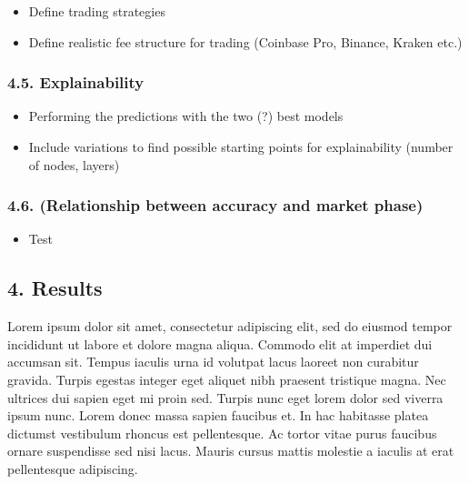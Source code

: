 \documentclass[
]{article}
\providecommand{\tightlist}{%
  \setlength{\itemsep}{0pt}\setlength{\parskip}{0pt}}
\begin{document}
\begin{itemize}
\item
  Define trading strategies
\item
  Define realistic fee structure for trading (Coinbase Pro, Binance,
  Kraken etc.)
\end{itemize}

\hypertarget{explainability}{%
\subsubsection{4.5. Explainability}\label{explainability}}

\begin{itemize}
\item
  Performing the predictions with the two (?) best models
\item
  Include variations to find possible starting points for explainability
  (number of nodes, layers)
\end{itemize}

\hypertarget{relationship-between-accuracy-and-market-phase}{%
\subsubsection{4.6. (Relationship between accuracy and market
phase)}\label{relationship-between-accuracy-and-market-phase}}

\begin{itemize}
\tightlist
\item
  Test
\end{itemize}

\newpage

\hypertarget{results}{%
\subsection{4. Results}\label{results}}

Lorem ipsum dolor sit amet, consectetur adipiscing elit, sed do eiusmod
tempor incididunt ut labore et dolore magna aliqua. Commodo elit at
imperdiet dui accumsan sit. Tempus iaculis urna id volutpat lacus
laoreet non curabitur gravida. Turpis egestas integer eget aliquet nibh
praesent tristique magna. Nec ultrices dui sapien eget mi proin sed.
Turpis nunc eget lorem dolor sed viverra ipsum nunc. Lorem donec massa
sapien faucibus et. In hac habitasse platea dictumst vestibulum rhoncus
est pellentesque. Ac tortor vitae purus faucibus ornare suspendisse sed
nisi lacus. Mauris cursus mattis molestie a iaculis at erat pellentesque
adipiscing.
\end{document}
